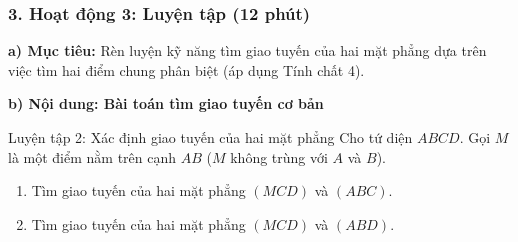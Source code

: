 \documentclass[12pt, a4paper]{article}
\begin{document}
\subsubsection*{3. Hoạt động 3: Luyện tập (12 phút)}

\noindent \textbf{a) Mục tiêu:}
Rèn luyện kỹ năng tìm giao tuyến của hai mặt phẳng dựa trên việc tìm hai điểm chung phân biệt (áp dụng Tính chất 4).

\noindent \textbf{b) Nội dung: Bài toán tìm giao tuyến cơ bản}
\begin{pedabox}{Luyện tập 2: Xác định giao tuyến của hai mặt phẳng}
Cho tứ diện $ABCD$. Gọi $M$ là một điểm nằm trên cạnh $AB$ ($M$ không trùng với $A$ và $B$).
\begin{enumerate}[leftmargin=0.6cm]
    \item Tìm giao tuyến của hai mặt phẳng $(MCD)$ và $(ABC)$.
    \item Tìm giao tuyến của hai mặt phẳng $(MCD)$ và $(ABD)$.
\end{enumerate}
\end{pedabox}
\end{document}
